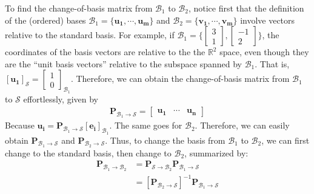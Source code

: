 To find the change-of-basis matrix from $\mathcal{B}_1$ to $\mathcal{B}_2$, notice first that the definition of the (ordered) bases $\mathcal{B}_1=\{\bm{u_1},\cdots,\bm{u_m}\}$ and $\mathcal{B}_2=\{\bm{v_1},\cdots,\bm{v_m}\}$ involve vectors relative to the standard basis. For example, if $\mathcal{B}_1=\Big\{\begin{bmatrix}3\\1\end{bmatrix},\begin{bmatrix}-1\\2\end{bmatrix}\Big\}$, the coordinates of the basis vectors are relative to the the $\mathbb{R}^2$ space, even though they are the ``unit basis vectors'' relative to the subspace spanned by $\mathcal{B}_1$. That is, $[\bm{u_1}]_{\mathcal{S}}=\begin{bmatrix}1\\0\end{bmatrix}_{\mathcal{B}_1}$. Therefore, we can obtain the change-of-basis matrix from $\mathcal{B}_1$ to $\mathcal{S}$ effortlessly, given by
  \begin{align}
    \bm{P}_{\mathcal{B}_1\rightarrow\mathcal{S}}=
    \begin{bmatrix}
      \bm{u_1}& \cdots& \bm{u_n}
    \end{bmatrix}
  \end{align}
  Because $\bm{u_i}=\bm{P}_{\mathcal{B}_1\rightarrow\mathcal{S}}[\bm{e_i}]_{\mathcal{B}_1}$. The same goes for $\mathcal{B}_2$. Therefore, we can easily obtain $\bm{P}_{\mathcal{B}_1\rightarrow\mathcal{S}}$ and $\bm{P}_{\mathcal{B}_2\rightarrow\mathcal{S}}$. Thus, to change the basis from $\mathcal{B}_1$ to $\mathcal{B}_2$, we can first change to the standard basis, then change to $\mathcal{B}_2$, summarized by:
  \begin{align}
    \bm{P}_{\mathcal{B}_1\rightarrow\mathcal{B}_2}&=\bm{P}_{\mathcal{S}\rightarrow\mathcal{B}_2}\bm{P}_{\mathcal{B}_1\rightarrow\mathcal{S}}\\
   &= [\bm{P}_{\mathcal{B}_2\rightarrow\mathcal{S}}]^{-1}\bm{P}_{\mathcal{B}_1\rightarrow\mathcal{S}}
  \end{align}


